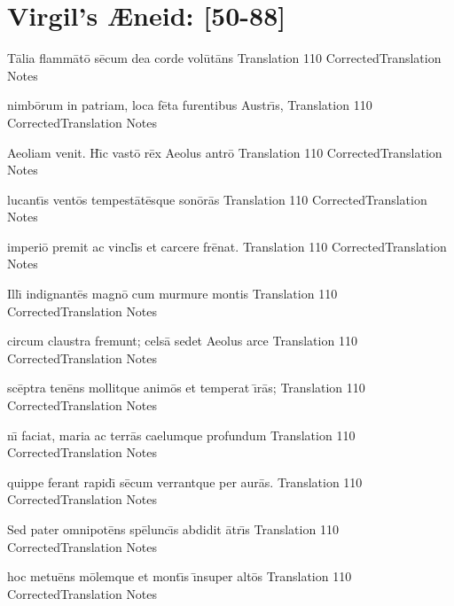 \documentclass[]{article}
\begin{document}
\section*{Virgil's {\AE}neid:  [50-88]} %



\latline
  {T\={a}lia flamm\={a}t\={o} s\={e}cum dea corde vol\={u}t\={a}ns}
  { Translation }
  {110}
  { CorrectedTranslation }
  { Notes }


\latline
  {nimb\={o}rum in patriam, loca f\={e}ta furentibus Austr\={\i}s,}
  { Translation }
  {110}
  { CorrectedTranslation }
  { Notes }


\latline
  {Aeoliam venit.  H\={\i}c vast\={o} r\={e}x Aeolus antr\={o}}
  { Translation }
  {110}
  { CorrectedTranslation }
  { Notes }


\newpage

\latline
  {lucant\={\i}s vent\={o}s tempest\={a}t\={e}sque son\={o}r\={a}s}
  { Translation }
  {110}
  { CorrectedTranslation }
  { Notes }


\latline
  {imperi\={o} premit ac vincl\={\i}s et carcere fr\={e}nat.}
  { Translation }
  {110}
  { CorrectedTranslation }
  { Notes }


\latline
  {Ill\={\i} indignant\={e}s magn\={o} cum murmure montis}
  { Translation }
  {110}
  { CorrectedTranslation }
  { Notes }


\latline
  {circum claustra fremunt; cels\={a} sedet Aeolus arce}
  { Translation }
  {110}
  { CorrectedTranslation }
  { Notes }


\latline
  {sc\={e}ptra ten\={e}ns mollitque anim\={o}s et temperat \={\i}r\={a}s;}
  { Translation }
  {110}
  { CorrectedTranslation }
  { Notes }


\latline
  {n\={\i} faciat, maria ac terr\={a}s caelumque profundum}
  { Translation }
  {110}
  { CorrectedTranslation }
  { Notes }


\latline
  {quippe ferant rapid\={\i} s\={e}cum verrantque per aur\={a}s.}
  { Translation }
  {110}
  { CorrectedTranslation }
  { Notes }


\latline
  {Sed pater omnipot\={e}ns sp\={e}lunc\={\i}s abdidit \={a}tr\={\i}s}
  { Translation }
  {110}
  { CorrectedTranslation }
  { Notes }


\latline
  {hoc metu\={e}ns m\={o}lemque et mont\={\i}s \={\i}nsuper alt\={o}s}
  { Translation }
  {110}
  { CorrectedTranslation }
  { Notes }
\end{document}
